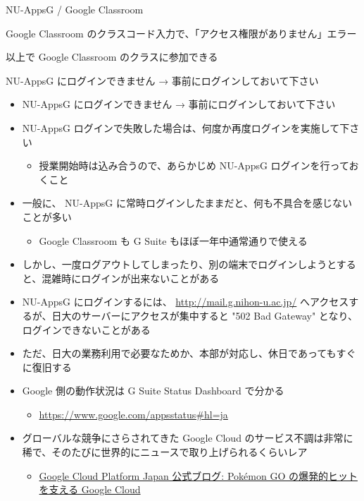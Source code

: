 \documentclass[a4j,10pt]{jsarticle}
\begin{document}
{\begin{frame}[label={sec:orgbe869cf},fragile]{NU-AppsG / Google Classroom}
\begin{block}{Google Classroom のクラスコード入力で、「アクセス権限がありません」エラー}
\begin{enumerate}
\end{enumerate}
\par
以上で Google Classroom のクラスに参加できる
\end{block}
\par
\begin{block}{NU-AppsG にログインできません → 事前にログインしておいて下さい}
\begin{itemize}
\item NU-AppsG にログインできません → 事前にログインしておいて下さい
\par
\item NU-AppsG ログインで失敗した場合は、何度か再度ログインを実施して下さい
\begin{itemize}
\item 授業開始時は込み合うので、あらかじめ NU-AppsG ログインを行っておくこと
\end{itemize}
\par
\item 一般に、 NU-AppsG に常時ログインしたままだと、何も不具合を感じないことが多い
\begin{itemize}
\item Google Classroom も G Suite もほぼ一年中通常通りで使える
\end{itemize}
\par
\item しかし、一度ログアウトしてしまったり、別の端末でログインしようとすると、混雑時にログインが出来ないことがある
\par
\item NU-AppsG にログインするには、
\url{http://mail.g.nihon-u.ac.jp/}
へアクセスするが、日大のサーバーにアクセスが集中すると "502 Bad Gateway" となり、ログインできないことがある
\par
\item ただ、日大の業務利用で必要なためか、本部が対応し、休日であってもすぐに復旧する
\item Google 側の動作状況は G Suite Status Dashboard で分かる
\begin{itemize}
\item \url{https://www.google.com/appsstatus\#hl=ja}
\end{itemize}
\par
\item グローバルな競争にさらされてきた Google Cloud のサービス不調は非常に稀で、そのたびに世界的にニュースで取り上げられるくらいレア
\begin{itemize}
\item \href{https://cloudplatform-jp.googleblog.com/2016/10/pokemon-go-google-cloud.html}{Google Cloud Platform Japan 公式ブログ: Pokémon GO の爆発的ヒットを支える Google Cloud}

\end{itemize}
\end{itemize}
\end{block}
\end{frame}}
\end{document}

